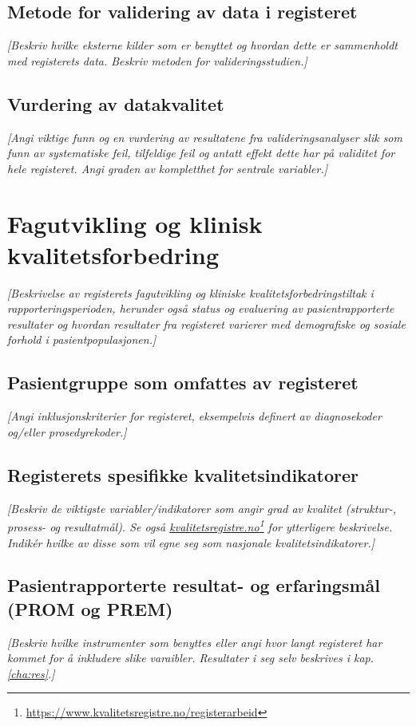 \documentclass[norsk, a4paper, twocolumn]{report}
\newcommand{\guide}[1] {
	\textit{[\textcolor{guidegray}{#1}]}
	}
\begin{document}
\section{Metode for validering av data i registeret}\label{sec:metval}
\guide{Beskriv hvilke eksterne kilder som er benyttet og hvordan
dette er sammenholdt med registerets data. Beskriv metoden for
valideringsstudien.} 

\section{Vurdering av datakvalitet}\label{sec:valdat}
\guide{Angi viktige funn og en vurdering av resultatene fra
valideringsanalyser slik som funn av systematiske feil, tilfeldige feil og
antatt effekt dette har på validitet for hele registeret. Angi graden av
kompletthet for sentrale variabler.}




\chapter{Fagutvikling og klinisk kvalitetsforbedring}\label{cha:fag}
\guide{Beskrivelse av registerets fagutvikling og kliniske
kvalitetsforbedringstiltak
i rapporteringsperioden, herunder også status og evaluering av
pasientrapporterte resultater og hvordan resultater fra registeret varierer
med demografiske og sosiale forhold i pasientpopulasjonen.}

\section{Pasientgruppe som omfattes av registeret}
\guide{Angi inklusjonskriterier for registeret, eksempelvis definert av
diagnosekoder og/eller prosedyrekoder.}

\section{Registerets spesifikke kvalitetsindikatorer}\label{sec:regspe}
\guide{Beskriv de viktigste variabler/indikatorer som angir grad av
kvalitet (struktur-, prosess- og resultatmål). Se også
\href{https://www.kvalitetsregistre.no/registerarbeid}{kvalitetsregistre.no}\footnote{\url{https://www.kvalitetsregistre.no/registerarbeid}}
for ytterligere beskrivelse. Indikér hvilke av disse som vil egne seg som
nasjonale kvalitetsindikatorer.}

\section{Pasientrapporterte resultat- og erfaringsmål (PROM og PREM)}\label{sec:pasutk}
\guide{Beskriv hvilke instrumenter som benyttes eller angi hvor langt
registeret har kommet for å inkludere slike varaibler. Resultater i seg selv
beskrives i kap. \ref{cha:res}.}
\end{document}
